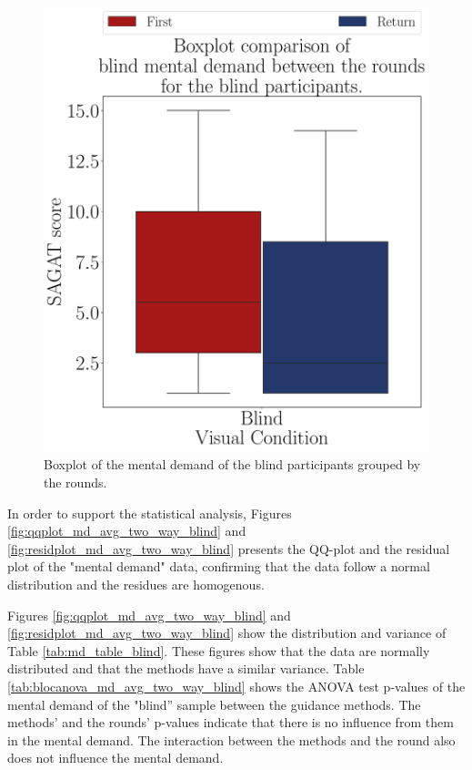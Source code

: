\begin{figure}[!htb]
\begin{minipage}{0.075\textwidth}
        \hfill
    \end{minipage}
    \begin{minipage}{0.45\textwidth}
        \centering
        \includegraphics[width = \textwidth]{Resultados/Nasa/Figuras/pdf/boxplot_md_blind_rounds.pdf}
        \caption{Boxplot of the mental demand of the blind participants grouped by the rounds.}
        \label{fig:boxplot_md_blind_rounds}
    \end{minipage}
\end{figure}

In order to support the statistical analysis, Figures \ref{fig:qqplot_md_avg_two_way_blind} and \ref{fig:residplot_md_avg_two_way_blind} presents the QQ-plot and the residual plot of the "mental demand" data, confirming that the data follow a normal distribution and the residues are homogenous.

Figures \ref{fig:qqplot_md_avg_two_way_blind} and \ref{fig:residplot_md_avg_two_way_blind} show the distribution and variance of Table \ref{tab:md_table_blind}. These figures show that the data are normally distributed and that the methods have a similar variance. Table \ref{tab:blocanova_md_avg_two_way_blind} shows the ANOVA test p-values of the mental demand of the "blind” sample between the guidance methods. The methods' and the rounds' p-values indicate that there is no influence from them in the mental demand. The interaction between the methods and the round also does not influence the mental demand.

